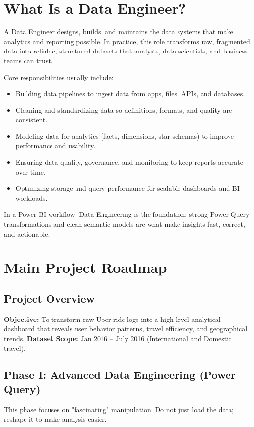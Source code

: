 \chapter{What Is a Data Engineer?}
A Data Engineer designs, builds, and maintains the data systems that make analytics and reporting possible. In practice, this role transforms raw, fragmented data into reliable, structured datasets that analysts, data scientists, and business teams can trust.

Core responsibilities usually include:
\begin{itemize}
    \item Building data pipelines to ingest data from apps, files, APIs, and databases.
    \item Cleaning and standardizing data so definitions, formats, and quality are consistent.
    \item Modeling data for analytics (facts, dimensions, star schemas) to improve performance and usability.
    \item Ensuring data quality, governance, and monitoring to keep reports accurate over time.
    \item Optimizing storage and query performance for scalable dashboards and BI workloads.
\end{itemize}

In a Power BI workflow, Data Engineering is the foundation: strong Power Query transformations and clean semantic models are what make insights fast, correct, and actionable.

\chapter{Main Project Roadmap}

\section{Project Overview}
\textbf{Objective:} To transform raw Uber ride logs into a high-level analytical dashboard that reveals user behavior patterns, travel efficiency, and geographical trends.
\newline
\textbf{Dataset Scope:} Jan 2016 -- July 2016 (International and Domestic travel).

\section{Phase I: Advanced Data Engineering (Power Query)}
This phase focuses on "fascinating" manipulation. Do not just load the data; reshape it to make analysis easier.

